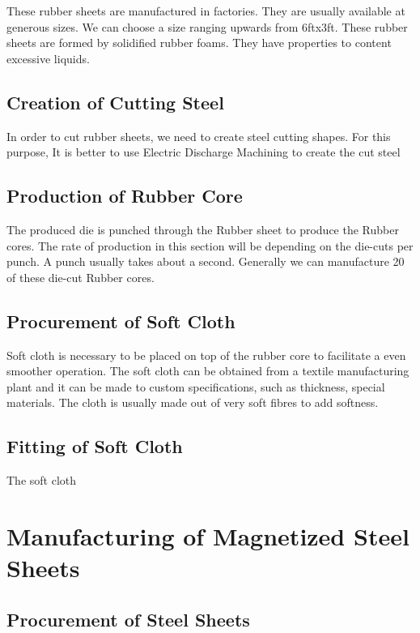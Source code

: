 \documentclass[12pt,a4paper,oneside]{article}
\begin{document}
These rubber sheets are manufactured in factories. They are usually available at generous sizes. We can choose a size ranging upwards from 6ftx3ft. These rubber sheets are formed by solidified rubber foams. They have properties to content excessive liquids. 

\subsection{Creation of Cutting Steel}

In order to cut rubber sheets, we need to create steel cutting shapes. For this purpose, It is better to use Electric Discharge Machining to create the cut steel

\subsection{Production of Rubber Core}

The produced die is punched through the Rubber sheet to produce the Rubber cores. The rate of production in this section will be depending on the die-cuts per punch. A punch usually takes about a second. Generally we can manufacture 20 of these die-cut Rubber cores. 

\subsection{Procurement of Soft Cloth}

Soft cloth is necessary to be placed on top of the rubber core to facilitate a even smoother operation. The soft cloth can be obtained from a textile manufacturing plant and it can be made to custom specifications, such as thickness, special materials. The cloth is usually made out of very soft fibres to add softness.


\subsection{Fitting of Soft Cloth}

The soft cloth 


\newpage

\section{Manufacturing of Magnetized Steel Sheets}

\subsection{Procurement of Steel Sheets}
\end{document}
